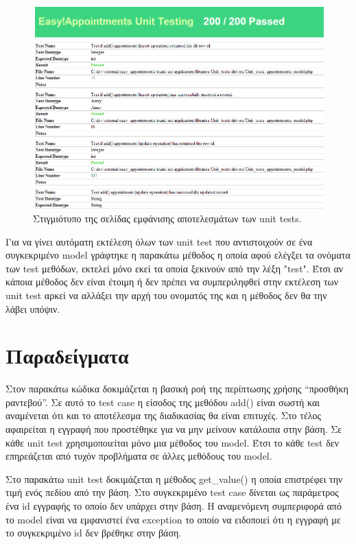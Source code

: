 \begin{figure}[h]
\centering
\includegraphics[width=150mm]{images/ea-unit-testing.png}
\caption{Στιγμιότυπο της σελίδας εμφάνισης αποτελεσμάτων των unit tests.}
\label{ea-unit-testing}
\end{figure}

Για να γίνει αυτόματη εκτέλεση όλων των unit test που αντιστοιχούν σε ένα συγκεκριμένο model γράφτηκε η παρακάτω μέθοδος η οποία αφού ελέγξει τα ονόματα των test μεθόδων, εκτελεί μόνο εκεί τα οποία ξεκινούν από την λέξη "test". Έτσι αν κάποια μέθοδος δεν είναι έτοιμη ή δεν πρέπει να συμπεριληφθεί στην εκτέλεση των unit test αρκεί να αλλάξει την αρχή του ονοματός της και η μέθοδος δεν θα την λάβει υπόψιν.

 

\section {Παραδείγματα} 
Στον παρακάτω κώδικα δοκιμάζεται η βασική ροή της περίπτωσης χρήσης “προσθήκη ραντεβού”. Σε αυτό το test case η είσοδος της μεθόδου add() είναι σωστή και αναμένεται ότι και το αποτέλεσμα της διαδικασίας θα είναι επιτυχές. Στο τέλος αφαιρείται η εγγραφή που προστέθηκε για να μην μείνουν κατάλοιπα στην βάση. Σε κάθε unit test χρησιμοποιείται μόνο μια μέθοδος του model. Έτσι το κάθε test δεν επηρεάζεται από τυχόν προβλήματα σε άλλες μεθόδους του model.



Στο παρακάτω unit test δοκιμάζεται η μέθοδος get\_value() η οποία επιστρέφει την τιμή ενός πεδίου από την βάση. Στο συγκεκριμένο test case δίνεται ως παράμετρος ένα id εγγραφής το οποίο δεν υπάρχει στην βάση. Η αναμενόμενη συμπεριφορά από το model είναι να εμφανιστεί ένα exception το οποίο να ειδοποιεί ότι η εγγραφή με το συγκεκριμένο id δεν βρέθηκε στην βάση.


